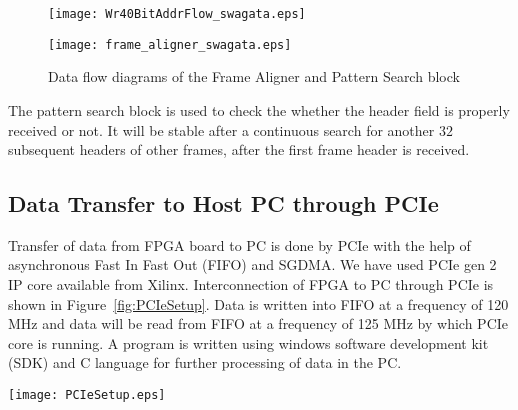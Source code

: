 \documentclass[a4paper]{jpconf}
\begin{document}
\begin{figure}[h]
\begin{minipage}{14pc}\vspace{-5pc}
\texttt{[image: Wr40BitAddrFlow\_swagata.eps]}
\caption{\label{fig:FrameAlignerFlow}Algorithm for Frame Aligner and Pattern Search}
\end{minipage}\hspace{6pc}\begin{minipage}{14pc}\vspace{-4pc}
\vspace{3pc}
\texttt{[image: frame\_aligner\_swagata.eps]}
\caption{\label{fig:FrameAlignerWork}Data flow diagrams of the Frame Aligner and Pattern Search block}
\end{minipage} 
\end{figure}
\vspace{-1 pc}
The pattern search block is used to check the whether the header field is properly received or not. It will be stable after a continuous search for another $32$ subsequent headers of other frames, after the first frame header is received.


\vspace{-1 pc}
\subsection{Data Transfer to Host PC through PCIe}
Transfer of data from FPGA board to PC is done by PCIe with the help of asynchronous Fast In Fast Out (FIFO) and SGDMA. We have used PCIe gen 2 IP core available from Xilinx. Interconnection of FPGA to PC through PCIe is shown in Figure~\ref{fig:PCIeSetup}. Data is written into FIFO at a frequency of 120 MHz and  data will be read from FIFO at a frequency of 125 MHz by which PCIe core is running. A program is written using windows software development kit (SDK) and C language for further processing of data in the PC.  
\begin{figure*}[htb]
\hspace{-2pc}
\texttt{[image: PCIeSetup.eps]}
\vspace{-5 pt}
\caption{ PCIe interfacing with blocks and Experimental setup of proposed DAQ}
\label{fig:PCIeSetup}

\end{figure*}
\vspace{-1 pc}
\end{document}
